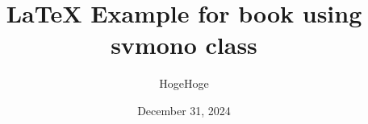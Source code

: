 \documentclass[lualatex,graybox,envcountchap,sectrefs,11pt]{svmono}
\date{December 31, 2024}
\begin{document}
\bibliographyunit[\chapter]

\author{HogeHoge}
\title{LaTeX Example for book using svmono class}

\maketitle

\frontmatter%

% 




\tableofcontents

\mainmatter%











\end{document}
